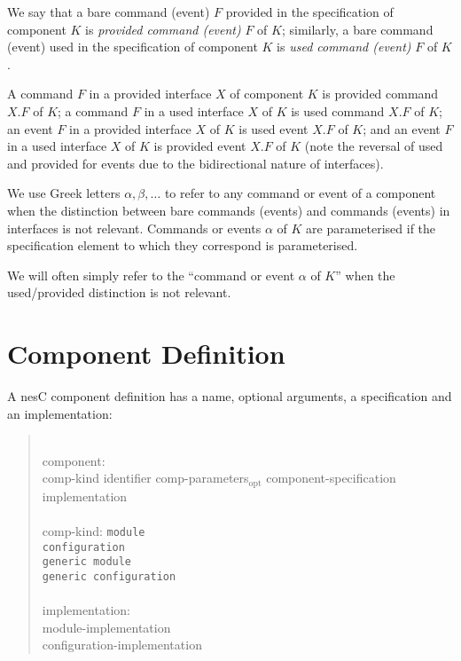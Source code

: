 \documentclass[11pt,letterpaper]{article}
\newcommand{\kw}[1]{{\tt #1}}
\newcommand{\nesc}{nesC\xspace}
\newcommand{\opt}{$_{\mbox{opt}}$\xspace}
\newcommand{\grammarshift}{\vspace*{-.7cm}}
\newcommand{\grammarindent}{\hspace*{2cm}\= \\ \kill}
\begin{document}
We say that a bare command (event) $F$ provided in the specification of
component $K$ is \emph{provided command (event)} $F$ of $K$; similarly, a
bare command (event) used in the specification of component $K$ is
\emph{used command (event)} $F$ of $K$.

A command $F$ in a provided interface $X$ of component $K$ is
provided command $X.F$ of $K$; a command $F$ in a used interface
$X$ of $K$ is used command $X.F$ of $K$; an event $F$ in a provided
interface $X$ of $K$ is used event $X.F$ of $K$; and an event $F$
in a used interface $X$ of $K$ is provided event $X.F$ of $K$
(note the reversal of used and provided for events due to the bidirectional
nature of interfaces). 

We use Greek letters $\alpha, \beta, \ldots$ to refer to any command or
event of a component when the distinction between bare commands (events)
and commands (events) in interfaces is not relevant. Commands or events
$\alpha$ of $K$ are parameterised if the specification element to which they
correspond is parameterised.

We will often simply refer to the ``command or event $\alpha$ of $K$'' when
the used/provided distinction is not relevant.

\section{Component Definition}
\label{sec:component}

A \nesc component definition has a name, optional arguments, a
specification and an implementation:
\begin{quote} \grammarshift \em \begin{tabbing}
\grammarindent
component:\\
\>	comp-kind identifier comp-parameters\opt component-specification implementation\\
\\
comp-kind:
\>	\kw{module}\\
\>	\kw{configuration}\\
\>	\kw{generic module}\\
\>	\kw{generic configuration}\\
\\
implementation:\\
\>	module-implementation\\
\>	configuration-implementation
\end{tabbing} \end{quote}
\end{document}
